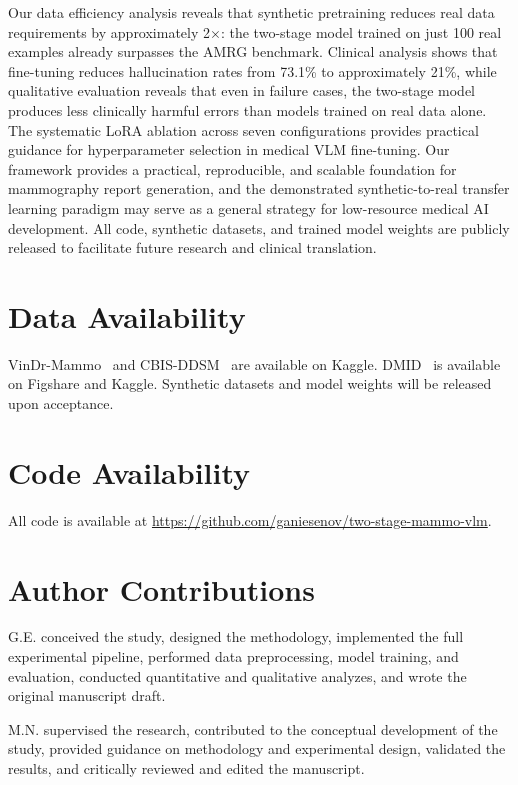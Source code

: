 \documentclass{wlscirep}
\begin{document}
Our data efficiency analysis reveals that synthetic pretraining reduces real data requirements by approximately 2$\times$: the two-stage model trained on just 100 real examples already surpasses the AMRG benchmark. Clinical analysis shows that fine-tuning reduces hallucination rates from 73.1\% to approximately 21\%, while qualitative evaluation reveals that even in failure cases, the two-stage model produces less clinically harmful errors than models trained on real data alone. The systematic LoRA ablation across seven configurations provides practical guidance for hyperparameter selection in medical VLM fine-tuning. Our framework provides a practical, reproducible, and scalable foundation for mammography report generation, and the demonstrated synthetic-to-real transfer learning paradigm may serve as a general strategy for low-resource medical AI development. All code, synthetic datasets, and trained model weights are publicly released to facilitate future research and clinical translation.

\section*{Data Availability}

VinDr-Mammo~\cite{nguyen2023vindr} and CBIS-DDSM~\cite{lee2017curated} are available on Kaggle. DMID~\cite{oza2024} is available on Figshare and Kaggle. Synthetic datasets and model weights will be released upon acceptance.

\section*{Code Availability}

All code is available at \url{https://github.com/ganiesenov/two-stage-mammo-vlm}.

\section*{Author Contributions}

G.E. conceived the study, designed the methodology, implemented the full experimental pipeline, performed data preprocessing, model training, and evaluation, conducted quantitative and qualitative analyzes, and wrote the original manuscript draft.
 
M.N. supervised the research, contributed to the conceptual development of the study, provided guidance on methodology and experimental design, validated the results, and critically reviewed and edited the manuscript.
 
\end{document}
